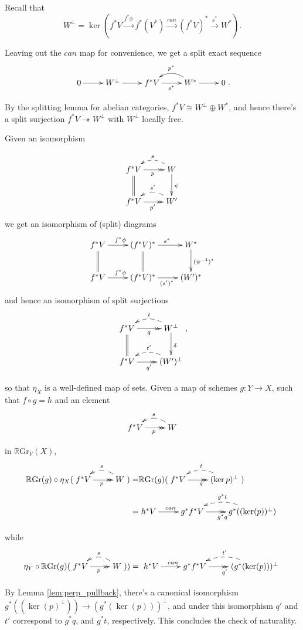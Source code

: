 \documentclass[draftthesis,tocnosub,noragright,centerchapter,10pt]{uiucthesis2009}
\newcommand{\RGr}{\mathbb R\mathrm{Gr}}
\theoremstyle{plain}
\theoremstyle{definition}
\begin{document}
Recall that 
\[
W^\perp = \ker(f^*V \xrightarrow{f^*\phi} f^*(V^*) \xrightarrow{can}
(f^*V)^* \xrightarrow{s^*} W^*).
\]



Leaving out the $can$ map for convenience, we get a split exact sequence 
\[
\xymatrix{0 \ar[r] & W^\perp \ar[r] & f^*V \ar[r]_{s^*}& \ar@/_1.0pc/[l]_{p^*} W^*
\ar[r] & 0}.
\]

By the splitting lemma for abelian categories, $f^*V \cong W^\perp
\oplus W^*$, and hence there's a split surjection $f^*V
\twoheadrightarrow W^\perp$ with $W^\perp$ locally free. 

Given an isomorphism 

\[
\xymatrix{f^*V \ar@{>>}[r]_p \ar@{=}[d]& \ar@/_1.0pc/@{-->}[l]_sW \ar[d]^\psi\\
f^*V \ar@{>>}[r]_{p'} & \ar@/_1.0pc/@{-->}[l]_{s'}W'}
\]
we get an isomorphism of (split) diagrams
\[
\xymatrix{f^*V \ar[r]^{f^*\phi}\ar@{=}[d] &(f^*V)^*\ar[r]^{s^*} \ar@{=}[d] & W^* \ar[d]^{(\psi^{-1})^*}\\
f^*V \ar[r]^{f^*\phi} & (f^*V)^* \ar[r]_{(s')^* }& (W')^*}
\]
and hence an isomorphism of split surjections
\[
\xymatrix{f^*V \ar@{>>}[r]_q \ar@{=}[d]& \ar@/_1.0pc/@{-->}[l]_tW^\perp \ar[d]^\delta\\
f^*V \ar@{>>}[r]_{q'} & \ar@/_1.0pc/@{-->}[l]_{t'}(W')^\perp},
\]

so that $\eta_X$ is a well-defined map of sets. Given a map of schemes
$g : Y \rightarrow X$, such that $f\circ g = h$ and an element 
\[
\xymatrix{f^*V \ar@{>>}[r]_p & \ar@/_1.0pc/@{-->}[l]_sW}
\]

in $\RGr_V(X)$, 
\begin{align*}
\RGr(g) \circ \eta_X(\xymatrix{f^*V \ar@{>>}[r]_p &
  \ar@/_1.0pc/@{-->}[l]_sW}) = & \RGr(g)( \xymatrix{f^*V \ar@{>>}[r]_q
  & \ar@/_1.0pc/@{-->}[l]_t(\ker p)^\perp})\\
 = & \xymatrix{h^*V \ar[r]^{can} & g^*f^*V \ar@{>>}[r]_{g^*q} &
  \ar@/_1.0pc/@{-->}[l]_{g^*t} g^*((\ker(p))^\perp)}
\end{align*}

while
\begin{align*}
\eta_Y\circ\RGr(g)(\xymatrix{f^*V \ar@{>>}[r]_p &
  \ar@/_1.0pc/@{-->}[l]_sW})) = \xymatrix{h^*V \ar[r]^{can} & g^*f^*V \ar@{>>}[r]_{q'} &
  \ar@/_1.0pc/@{-->}[l]_{t'} (g^*(\ker(p)))^\perp}
\end{align*}

By Lemma \ref{lem:perp_pullback}, there's a canonical isomorphism
$g^*((\ker(p)^\perp)) \rightarrow (g^*(\ker(p)))^\perp$, and under
this isomorphism $q'$ and $t'$ correspond to $g^*q$, and $g^*t$,
respectively. This concludes the check of naturality.
\end{document}
